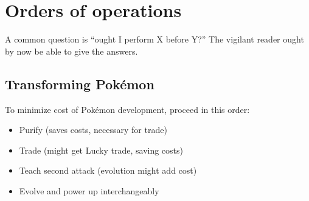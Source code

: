 \chapter{Orders of operations}
\label{chap:ooo}
A common question is ``ought I perform X before Y?''
The vigilant reader ought by now be able to give the answers.

\section{Transforming Pokémon}
\label{sec:pokemontransforms}
To minimize cost of Pokémon development, proceed in this order:
\begin{itemize}
\item Purify (saves costs, necessary for trade)
\item Trade (might get Lucky trade, saving costs)
\item Teach second attack (evolution might add cost)
\item Evolve and power up interchangeably
\end{itemize}

